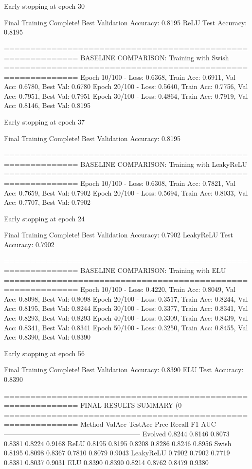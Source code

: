 Early stopping at epoch 30

Final Training Complete!
Best Validation Accuracy: 0.8195
ReLU Test Accuracy: 0.8195

============================================================
BASELINE COMPARISON: Training with Swish
============================================================
Epoch  10/100 - Loss: 0.6368, Train Acc: 0.6911, Val Acc: 0.6780, Best Val: 0.6780
Epoch  20/100 - Loss: 0.5640, Train Acc: 0.7756, Val Acc: 0.7951, Best Val: 0.7951
Epoch  30/100 - Loss: 0.4864, Train Acc: 0.7919, Val Acc: 0.8146, Best Val: 0.8195

Early stopping at epoch 37

Final Training Complete!
Best Validation Accuracy: 0.8195

============================================================
BASELINE COMPARISON: Training with LeakyReLU
============================================================
Epoch  10/100 - Loss: 0.6308, Train Acc: 0.7821, Val Acc: 0.7659, Best Val: 0.7902
Epoch  20/100 - Loss: 0.5694, Train Acc: 0.8033, Val Acc: 0.7707, Best Val: 0.7902

Early stopping at epoch 24

Final Training Complete!
Best Validation Accuracy: 0.7902
LeakyReLU Test Accuracy: 0.7902

============================================================
BASELINE COMPARISON: Training with ELU
============================================================
Epoch  10/100 - Loss: 0.4220, Train Acc: 0.8049, Val Acc: 0.8098, Best Val: 0.8098
Epoch  20/100 - Loss: 0.3517, Train Acc: 0.8244, Val Acc: 0.8195, Best Val: 0.8244
Epoch  30/100 - Loss: 0.3377, Train Acc: 0.8341, Val Acc: 0.8293, Best Val: 0.8293
Epoch  40/100 - Loss: 0.3309, Train Acc: 0.8439, Val Acc: 0.8341, Best Val: 0.8341
Epoch  50/100 - Loss: 0.3250, Train Acc: 0.8455, Val Acc: 0.8390, Best Val: 0.8390

Early stopping at epoch 56

Final Training Complete!
Best Validation Accuracy: 0.8390
ELU Test Accuracy: 0.8390

============================================================
FINAL RESULTS SUMMARY (0%
============================================================
Method             ValAcc     TestAcc    Prec       Recall     F1         AUC
------------------------------------------------------------
Evolved            0.8244     0.8146     0.8073     0.8381     0.8224     0.9168
ReLU               0.8195     0.8195     0.8208     0.8286     0.8246     0.8956
Swish              0.8195     0.8098     0.8367     0.7810     0.8079     0.9043
LeakyReLU          0.7902     0.7902     0.7719     0.8381     0.8037     0.9031
ELU                0.8390     0.8390     0.8214     0.8762     0.8479     0.9380

